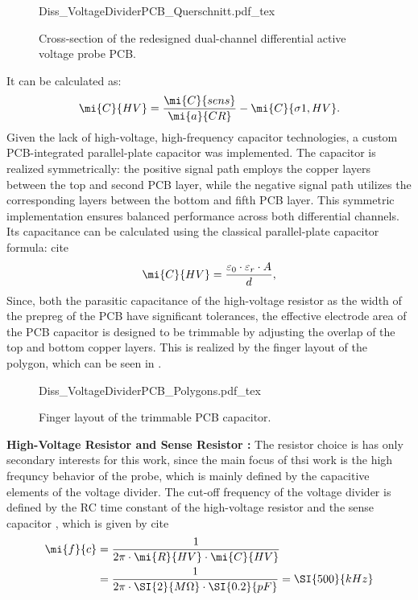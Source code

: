 \begin{figure}[ht]
	\centering
	{Diss_VoltageDividerPCB_Querschnitt.pdf_tex}
	\caption{Cross-section of the redesigned dual-channel differential active voltage probe PCB.}\label{fig:VoltageDividerPCB}
\end{figure}

It can be calculated as:
\begin{equation}
	\mi{C}{HV} = \frac{\mi{C}{sens}}{\mi{a}{CR}} - \mi{C}{\sigma 1,HV}.
\end{equation}
Given the lack of high-voltage, high-frequency capacitor technologies, a custom PCB-integrated parallel-plate capacitor was implemented. 
The capacitor is realized symmetrically: the positive signal path employs the copper layers between the top and second PCB layer, while the negative signal path utilizes the corresponding layers between the bottom and fifth PCB layer. 
This symmetric implementation ensures balanced performance across both differential channels.
Its capacitance can be calculated using the classical parallel-plate capacitor formula: cite
\begin{equation}
	\mi{C}{HV} = \frac{\varepsilon_0 \cdot \varepsilon_r \cdot A}{d},
\end{equation}
Since, both the parasitic capacitance  of the high-voltage resistor as the width of the prepreg of the PCB have significant tolerances, the effective electrode area of the PCB capacitor is designed to be trimmable by adjusting the overlap of the top and bottom copper layers.
This is realized by the finger layout of the polygon, which can be seen in .

\begin{figure}[ht]
	\centering
	{Diss_VoltageDividerPCB_Polygons.pdf_tex}
	\caption{Finger layout of the trimmable PCB capacitor.}\label{fig:VoltageDividerPCB_Polygon}
\end{figure}

\textbf{High-Voltage Resistor  and Sense Resistor :} 
The resistor choice is has only secondary interests for this work, since the main focus of thsi work is the high frequncy behavior of the probe, which is mainly defined by the capacitive elements of the voltage divider.
The cut-off frequency of the voltage divider is defined by the RC time constant of the high-voltage resistor  and the sense capacitor , which is given by cite
\begin{align}	
	\mi{f}{c} &= \frac{1}{2\pi \cdot \mi{R}{HV} \cdot \mi{C}{HV}} \\
				&= \frac{1}{2\pi \cdot \SI{2}{M\Omega} \cdot \SI{0.2}{pF}} = \SI{500}{kHz}	
\end{align}

